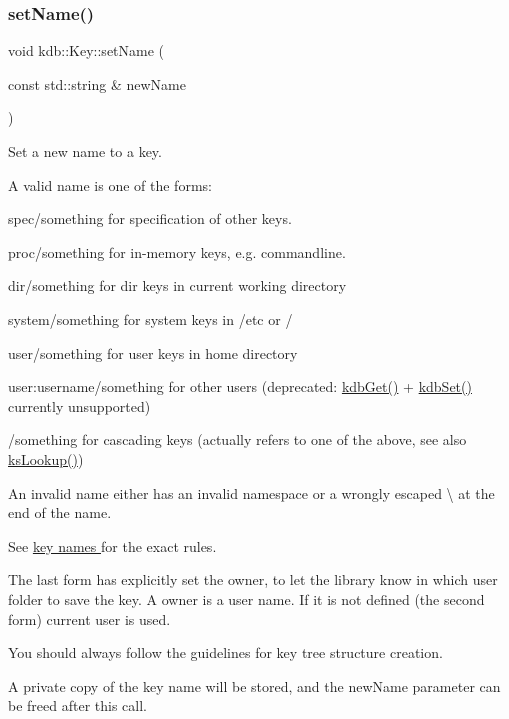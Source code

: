 \subsubsection{\texorpdfstring{set\+Name()}{setName()}}
{\footnotesize\ttfamily void kdb\+::\+Key\+::set\+Name (\begin{DoxyParamCaption}\item[{const std\+::string \&}]{new\+Name }\end{DoxyParamCaption})\hspace{0.3cm}{\ttfamily [inline]}}



Set a new name to a key. 

A valid name is one of the forms\+:
\begin{DoxyItemize}
\item {\ttfamily spec/something} for specification of other keys.
\item {\ttfamily proc/something} for in-\/memory keys, e.\+g. commandline.
\item {\ttfamily dir/something} for dir keys in current working directory
\item {\ttfamily system/something} for system keys in /etc or /
\item {\ttfamily user/something} for user keys in home directory
\item {\ttfamily user\+:username/something} for other users (deprecated\+: \hyperlink{group__kdb_ga28e385fd9cb7ccfe0b2f1ed2f62453a1}{kdb\+Get()} + \hyperlink{group__kdb_ga11436b058408f83d303ca5e996832bcf}{kdb\+Set()} currently unsupported)
\item {\ttfamily /something} for cascading keys (actually refers to one of the above, see also \hyperlink{group__keyset_gaa34fc43a081e6b01e4120daa6c112004}{ks\+Lookup()})
\end{DoxyItemize}

An invalid name either has an invalid namespace or a wrongly escaped \textbackslash{} at the end of the name.

See \hyperlink{group__keyname}{key names } for the exact rules.

The last form has explicitly set the owner, to let the library know in which user folder to save the key. A owner is a user name. If it is not defined (the second form) current user is used.

You should always follow the guidelines for key tree structure creation.

A private copy of the key name will be stored, and the {\ttfamily new\+Name} parameter can be freed after this call.

